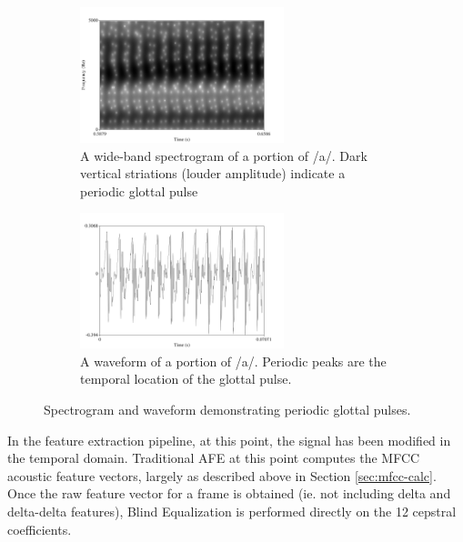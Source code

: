 \begin{figure}[H!]
\centering
\begin{subfigure}{0.75\textwidth}
\centering
\includegraphics[width=0.65\textwidth]{figure/glot-spect.png}
\caption{A wide-band spectrogram of a portion of /a/. Dark vertical striations (louder amplitude) indicate a periodic glottal pulse}\label{fig:glot-spect}
\end{subfigure}
\begin{subfigure}{0.75\textwidth}
\centering
\includegraphics[width=0.65\textwidth]{figure/glot-wav.png}
\caption{A waveform of a portion of /a/.  Periodic peaks are the temporal location of the glottal pulse.}\label{fig:glot-wav}
\end{subfigure}
\caption{Spectrogram and waveform demonstrating periodic glottal pulses.}\label{fig:glot-puls}
\end{figure}

In the feature extraction pipeline, at this point, the signal has been modified in the temporal domain.  Traditional AFE at this point computes the MFCC acoustic feature vectors, largely as described above in Section \ref{sec:mfcc-calc}.  Once the raw feature vector for a frame is obtained (ie. not including delta and delta-delta features), Blind Equalization is performed directly on the 12 cepstral coefficients.

